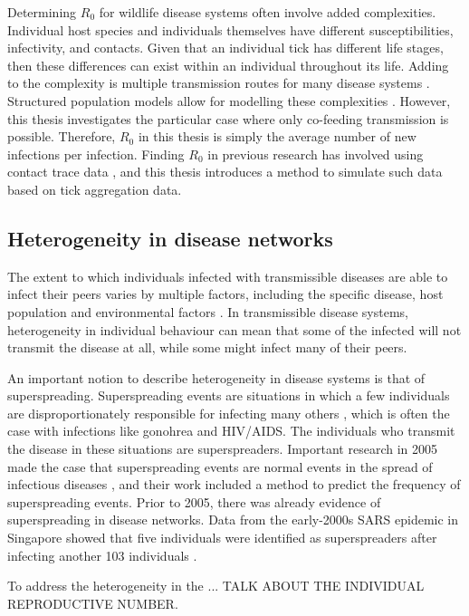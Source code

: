 \documentclass{article}
\begin{document}
Determining $ R_0 $ for wildlife disease systems often involve added complexities. Individual host species and individuals themselves have different susceptibilities, infectivity, and contacts. Given that an individual tick has different life stages, then these differences can exist within an individual throughout its life. Adding to the complexity is multiple transmission routes for many disease systems \cite{Hartemink2008}. Structured population models allow for modelling these complexities \cite{Diekman2000}. However, this thesis investigates the particular case where only co-feeding transmission is possible. Therefore, $ R_0 $ in this thesis is simply the average number of new infections per infection. Finding $ R_0 $ in previous research has involved using contact trace data \cite{LloydSmith2005}, and this thesis introduces a method to simulate such data based on tick aggregation data.

\subsection{Heterogeneity in disease networks}

The extent to which individuals infected with transmissible diseases are able to infect their peers varies by multiple factors, including the specific disease, host population and environmental factors \cite{LloydSmith2005}. In transmissible disease systems, heterogeneity in individual behaviour can mean that some of the infected will not transmit the disease at all, while some might infect many of their peers.

An important notion to describe heterogeneity in disease systems is that of superspreading. Superspreading events are situations in which a few individuals are disproportionately responsible for infecting many others \cite{Galvani_2005}, which is often the case with infections like gonohrea and HIV/AIDS. The individuals who transmit the disease in these situations are superspreaders. Important research in 2005 made the case that superspreading events are normal events in the spread of infectious diseases \cite{LloydSmith2005}, and their work included a method to predict the frequency of superspreading events. Prior to 2005, there was already evidence of superspreading in disease networks. Data from the early-2000s SARS epidemic in Singapore showed that five individuals were identified as superspreaders after infecting another 103 individuals \cite{CDC2003}.

To address the heterogeneity in the ... TALK ABOUT THE INDIVIDUAL REPRODUCTIVE NUMBER. 
\end{document}
